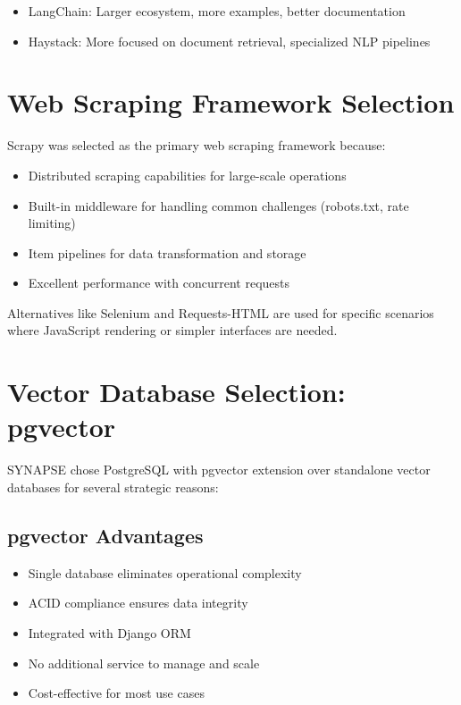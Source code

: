 \documentclass[12pt,a4paper]{report}
\begin{document}
\begin{itemize}
    \item LangChain: Larger ecosystem, more examples, better documentation
    \item Haystack: More focused on document retrieval, specialized NLP pipelines
\end{itemize}

\section{Web Scraping Framework Selection}

Scrapy was selected as the primary web scraping framework because:

\begin{itemize}
    \item Distributed scraping capabilities for large-scale operations
    \item Built-in middleware for handling common challenges (robots.txt, rate limiting)
    \item Item pipelines for data transformation and storage
    \item Excellent performance with concurrent requests
\end{itemize}

Alternatives like Selenium and Requests-HTML are used for specific scenarios where JavaScript rendering or simpler interfaces are needed.

\section{Vector Database Selection: pgvector}

SYNAPSE chose PostgreSQL with pgvector extension over standalone vector databases for several strategic reasons:

\subsection{pgvector Advantages}

\begin{itemize}
    \item Single database eliminates operational complexity
    \item ACID compliance ensures data integrity
    \item Integrated with Django ORM
    \item No additional service to manage and scale
    \item Cost-effective for most use cases
\end{itemize}
\end{document}
